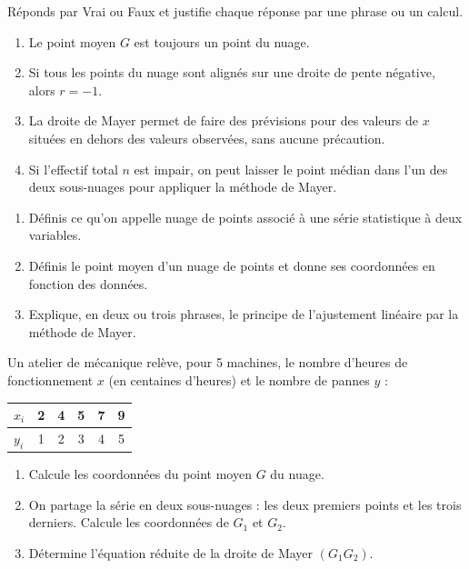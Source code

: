 \documentclass[11pt]{article}
\newcommand{\cle}[1]{{\popxbold\color{popdark}#1}}
\begin{document}
\begin{exercice}
Réponds par Vrai ou Faux et justifie chaque réponse par une phrase ou un calcul.
\begin{enumerate}
\item Le point moyen $G$ est toujours un point du nuage.
\item Si tous les points du nuage sont alignés sur une droite de pente négative, alors $r = -1$.
\item La droite de Mayer permet de faire des prévisions pour des valeurs de $x$ situées en dehors des valeurs observées, sans aucune précaution.
\item Si l'effectif total $n$ est impair, on peut laisser le point médian dans l'un des deux sous-nuages pour appliquer la méthode de Mayer.
\end{enumerate}
\end{exercice}

\begin{exercice}[Définitions]
\begin{enumerate}
\item Définis ce qu'on appelle \cle{nuage de points} associé à une série statistique à deux variables.
\item Définis le \cle{point moyen} d'un nuage de points et donne ses coordonnées en fonction des données.
\item Explique, en deux ou trois phrases, le principe de l'\cle{ajustement linéaire par la méthode de Mayer}.
\end{enumerate}
\end{exercice}

\begin{exercice}
Un atelier de mécanique relève, pour 5 machines, le nombre d'heures de fonctionnement $x$ (en centaines d'heures) et le nombre de pannes $y$ :
\begin{center}
\begin{tabular}{|l|ccccc|}
\hline
\rowcolor{popblueL} $x_i$ & 2 & 4 & 5 & 7 & 9 \\
\hline
$y_i$ & 1 & 2 & 3 & 4 & 5 \\
\hline
\end{tabular}
\end{center}
\begin{enumerate}
\item Calcule les coordonnées du point moyen $G$ du nuage.
\item On partage la série en deux sous-nuages : les deux premiers points et les trois derniers. Calcule les coordonnées de $G_1$ et $G_2$.
\item Détermine l'équation réduite de la droite de Mayer $(G_1G_2)$.
\end{enumerate}
\end{exercice}
\end{document}
